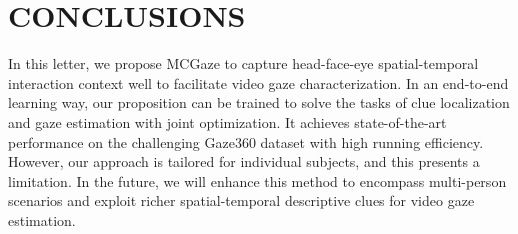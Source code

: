 \documentclass[journal]{IEEEtran}
\begin{document}
\section{CONCLUSIONS}
In this letter, we propose MCGaze to capture head-face-eye spatial-temporal interaction context well to facilitate video gaze characterization. 
In an end-to-end learning way, our proposition can be trained to solve the tasks of clue localization and gaze estimation with joint optimization.
It achieves state-of-the-art performance on the challenging Gaze360 dataset with high running efficiency. 
However, our approach is tailored for individual subjects, and this presents a limitation. In the future, we will enhance this method to encompass multi-person scenarios and exploit richer spatial-temporal descriptive clues for video gaze estimation.









\end{document}
